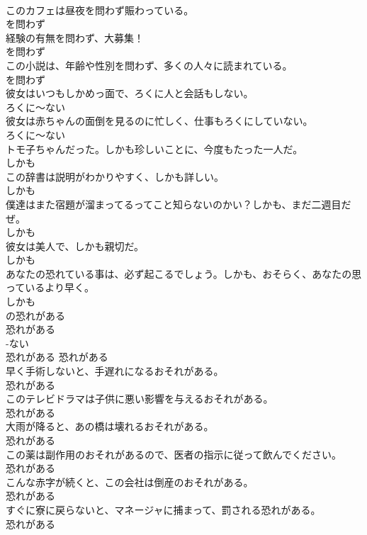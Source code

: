 \documentclass[8pt]{extreport}
\begin{document}
\begin{CJK}{UTF8}{min}
\\	このカフェは昼夜を問わず賑わっている。	
\\	を問わず
\\	経験の有無を問わず、大募集！	
\\	を問わず
\\	この小説は、年齢や性別を問わず、多くの人々に読まれている。	
\\	を問わず
\\	彼女はいつもしかめっ面で、ろくに人と会話もしない。	
\\	ろくに～ない
\\	彼女は赤ちゃんの面倒を見るのに忙しく、仕事もろくにしていない。	
\\	ろくに～ない
\\	トモ子ちゃんだった。しかも珍しいことに、今度もたった一人だ。	
\\	しかも
\\	この辞書は説明がわかりやすく、しかも詳しい。	
\\	しかも
\\	僕達はまた宿題が溜まってるってこと知らないのかい？しかも、まだ二週目だぜ。	
\\	しかも
\\	彼女は美人で、しかも親切だ。	
\\	しかも
\\	あなたの恐れている事は、必ず起こるでしょう。しかも、おそらく、あなたの思っているより早く。	
\\	しかも
\\	の恐れがある	
\\	恐れがある	
\\	-ない
\\	恐れがある	恐れがある
\\	早く手術しないと、手遅れになるおそれがある。	
\\	恐れがある
\\	このテレビドラマは子供に悪い影響を与えるおそれがある。	
\\	恐れがある
\\	大雨が降ると、あの橋は壊れるおそれがある。	
\\	恐れがある
\\	この薬は副作用のおそれがあるので、医者の指示に従って飲んでください。	
\\	恐れがある
\\	こんな赤字が続くと、この会社は倒産のおそれがある。	
\\	恐れがある
\\	すぐに寮に戻らないと、マネージャに捕まって、罰される恐れがある。	
\\	恐れがある

\end{CJK}
\end{document}
